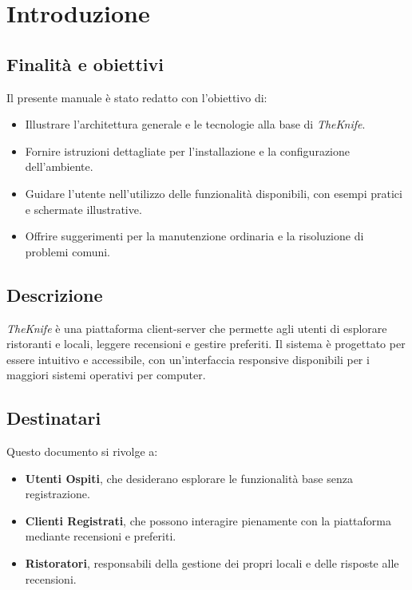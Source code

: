 \section{Introduzione}
\subsection{Finalità e obiettivi}
Il presente manuale è stato redatto con l'obiettivo di:
\begin{itemize}
    \item Illustrare l'architettura generale e le tecnologie alla base di \emph{TheKnife}.
    \item Fornire istruzioni dettagliate per l'installazione e la configurazione dell'ambiente.
    \item Guidare l'utente nell'utilizzo delle funzionalità disponibili, con esempi pratici e schermate illustrative.
    \item Offrire suggerimenti per la manutenzione ordinaria e la risoluzione di problemi comuni.
\end{itemize}

\subsection{Descrizione}
\emph{TheKnife} è una piattaforma client-server che permette agli utenti di esplorare ristoranti e locali, leggere recensioni e gestire preferiti. 
Il sistema è progettato per essere intuitivo e accessibile, 
con un'interfaccia responsive disponibili per i maggiori 
sistemi operativi per computer.

\subsection{Destinatari}
Questo documento si rivolge a:
\begin{itemize}
    \item \textbf{Utenti Ospiti}, che desiderano esplorare le funzionalità base senza registrazione.
    \item \textbf{Clienti Registrati}, che possono interagire pienamente con la piattaforma mediante recensioni e preferiti.
    \item \textbf{Ristoratori}, responsabili della gestione dei propri locali e delle risposte alle recensioni.
\end{itemize}

